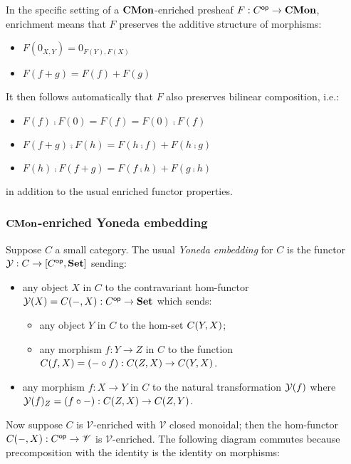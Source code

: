 In the specific setting of a $\mathbf{CMon}$-enriched presheaf $F: C^{\mathsf{op}} \to \mathbf{CMon}$, enrichment means that $F$
preserves the additive structure of morphisms:
\begin{itemize}
\item $F(0_{X,Y}) = 0_{F(Y),F(X)}$
\item $F(f + g) = F(f) + F(g)$
\end{itemize}
It then follows automatically that $F$ also preserves bilinear composition, i.e.:
\begin{itemize}
\item $F(f) \comp F(0) = F(f) = F(0) \comp F(f)$
\item $F(f + g) \comp F(h) = F(h \comp f) + F(h \comp g)$
\item $F(h) \comp F(f + g) = F(f \comp h) + F(g \comp h)$
\end{itemize}
in addition to the usual enriched functor properties.

\subsubsection{$\mathbf{CMon}$-enriched Yoneda embedding}

Suppose $C$ a small category. The usual \emph{Yoneda embedding} for $C$ is the functor $\mathcal{Y}: C \to
[C^{\mathsf{op}},\mathbf{Set}]$ sending:
\begin{itemize}
\item any object $X$ in $C$ to the contravariant hom-functor $\mathcal{Y}(X) = {C}(-,X): C^{\mathsf{op}} \to \mathbf{Set}$
which sends:
   \begin{itemize}
   \item any object $Y$ in $C$ to the hom-set ${C}(Y,X)$;
   \item any morphism $f: Y \to Z$ in $C$ to the function ${C}(f,X) = (- \circ f): {C}(Z,X) \to
   {C}(Y,X)$.
   \end{itemize}
\item any morphism $f: X \to Y$ in $C$ to the natural transformation $\mathcal{Y}(f)$ where $\mathcal{Y}(f)_Z = (f
\circ -): {C}(Z,X) \to {C}(Z,Y)$.
\end{itemize}

\noindent Now suppose $C$ is $\mathscr{V}$-enriched with $\mathscr{V}$ closed monoidal; then the hom-functor
${C}(-,X): C^{\mathsf{op}} \to \mathscr{V}$ is $\mathscr{V}$-enriched. The following diagram commutes because
precomposition with the identity is the identity on morphisms:

\begin{center}
\end{center}


